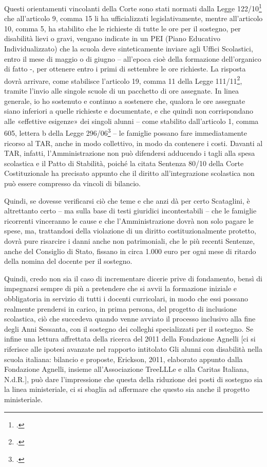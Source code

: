 Questi orientamenti vincolanti della Corte sono stati normati dalla Legge 122/10\footcite{Legge_122_2010} che all'articolo 9, comma 15 li ha ufficializzati legislativamente, mentre all'articolo 10, comma 5, ha stabilito che le richieste di tutte le ore per il sostegno, per disabilità lievi o gravi, vengano indicate in un PEI (Piano Educativo Individualizzato) che la scuola deve sinteticamente inviare agli Uffici Scolastici, entro il mese di maggio o di giugno – all'epoca cioè della formazione dell'organico di fatto -, per ottenere entro i primi di settembre le ore richieste. La risposta dovrà arrivare, come stabilisce l'articolo 19, comma 11 della Legge 111/11\footcite{legge_111_2011}, tramite l'invio alle singole scuole di un pacchetto di ore assegnate.
In linea generale, io ho sostenuto e continuo a sostenere che, qualora le ore assegnate siano inferiori a quelle richieste e documentate, e che quindi non corrispondano alle «effettive esigenze» dei singoli alunni – come stabilito dall'articolo 1, comma 605, lettera b della Legge 296/06\footcite{Legge_296_2006} – le famiglie possano fare immediatamente ricorso al TAR, anche in modo collettivo, in modo da contenere i costi. Davanti al TAR, infatti, l'Amministrazione non può difendersi adducendo i tagli alla spesa scolastica e il Patto di Stabilità, poiché la citata Sentenza 80/10 della Corte Costituzionale ha precisato appunto che il diritto all'integrazione scolastica non può essere compresso da vincoli di bilancio.

Quindi, se dovesse verificarsi ciò che teme e che anzi dà per certo Scataglini, è altrettanto certo – ma sulla base di testi giuridici incontestabili – che le famiglie ricorrenti vinceranno le cause e che l'Amministrazione dovrà non solo pagare le spese, ma, trattandosi della violazione di un diritto costituzionalmente protetto, dovrà pure risarcire i danni anche non patrimoniali, che le più recenti Sentenze, anche del Consiglio di Stato, fissano in circa 1.000 euro per ogni mese di ritardo della nomina del docente per il sostegno.

Quindi, credo non sia il caso di incrementare dicerie prive di fondamento, bensì di impegnarsi sempre di più a pretendere che si avvii la formazione iniziale e obbligatoria in servizio di tutti i docenti curricolari, in modo che essi possano realmente prendersi in carico, in prima persona, del progetto di inclusione scolastica, ciò che succedeva quando venne avviato il processo inclusivo alla fine degli Anni Sessanta, con il sostegno dei colleghi specializzati per il sostegno.
Se infine una lettura affrettata della ricerca del 2011 della Fondazione Agnelli [ci si riferisce alle ipotesi avanzate nel rapporto intitolato Gli alunni con disabilità nella scuola italiana: bilancio e proposte, Erickson, 2011, elaborato appunto dalla Fondazione Agnelli, insieme all'Associazione TreeLLLe e alla Caritas Italiana, N.d.R.], può dare l'impressione che questa della riduzione dei posti di sostegno sia la linea ministeriale, ci si sbaglia ad affermare che questo sia anche il progetto ministeriale.

